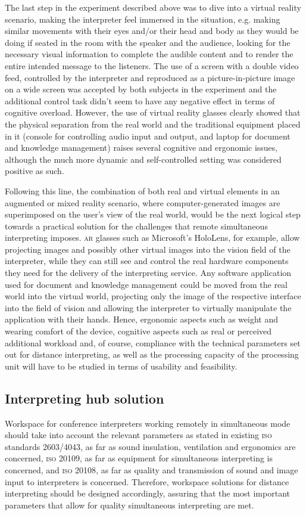 \documentclass[output=paper]{langsci/langscibook}
\begin{document}
The last step in the experiment described above was to dive into a virtual reality scenario, making the interpreter feel immersed in the situation, e.g. making similar movements with their eyes and/or their head and body as they would be doing if seated in the room with the speaker and the audience, looking for the necessary visual information to complete the audible content and to render the entire intended message to the listeners. The use of a screen with a double video feed, controlled by the interpreter and reproduced as a picture-in-picture image on a wide screen was accepted by both subjects in the experiment and the additional control task didn’t seem to have any negative effect in terms of cognitive overload. However, the use of virtual reality glasses clearly showed that the physical separation from the real world and the traditional equipment placed in it (console for controlling audio input and output, and laptop for document and knowledge management) raises several cognitive and ergonomic issues, although the much more dynamic and self-controlled setting was considered positive as such. 

Following this line, the combination of both real and virtual elements in an augmented or mixed reality scenario, where computer-generated images are superimposed on the user’s view of the real world, would be the next logical step towards a practical solution for the challenges that remote simultaneous interpreting imposes. \textsc{ar} glasses such as Microsoft’s HoloLens, for example, allow projecting images and possibly other virtual images into the vision field of the interpreter, while they can still see and control the real hardware components they need for the delivery of the interpreting service. Any software application used for document and knowledge management could be moved from the real world into the virtual world, projecting only the image of the respective interface into the field of vision and allowing the interpreter to virtually manipulate the application with their hands. Hence, ergonomic aspects such as weight and wearing comfort of the device, cognitive aspects such as real or perceived additional workload and, of course, compliance with the technical parameters set out for distance interpreting, as well as the processing capacity of the processing unit will have to be studied in terms of usability and feasibility.

\subsection{Interpreting hub solution}
\label{sub:ziegler:6.2}
Workspace for conference interpreters working remotely in simultaneous mode should take into account the relevant parameters as stated in existing \textsc{iso} standards \textsc{2603\slash4043}, as far as sound insulation, ventilation and ergonomics are concerned, \textsc{iso 20109}, as far as equipment for simultaneous interpreting is concerned, and \textsc{iso 20108}, as far as quality and transmission of sound and image input to interpreters is concerned. Therefore, workspace solutions for distance interpreting should be designed accordingly, assuring that the most important parameters that allow for quality simultaneous interpreting are met.
\end{document}
